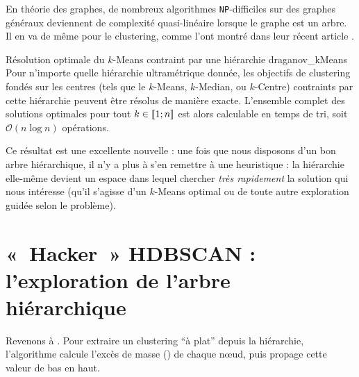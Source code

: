 En théorie des graphes, de nombreux algorithmes \texttt{NP}-difficiles sur des graphes généraux deviennent de complexité quasi-linéaire lorsque le graphe est un arbre. Il en va de même pour le clustering, comme l'ont montré  \etal dans leur récent article \cite{Draganov2025}.

\begin{Resultat}{Résolution optimale du $k$-Means contraint par une hiérarchie \cite{Draganov2025}}{draganov_kMeans}
Pour n'importe quelle hiérarchie ultramétrique donnée, les objectifs de clustering fondés sur les centres (tels que le $k$-Means, $k$-Median, ou $k$-Centre) contraints par cette hiérarchie peuvent être résolus de manière exacte. L'ensemble complet des solutions optimales pour tout $k \in \left[\!\left[ 1 ; n \right]\!\right]$ est alors calculable en temps de tri, soit $\mathcal{O}(n \log n)$ opérations.
\end{Resultat}

Ce résultat est une excellente nouvelle : une fois que nous disposons d'un bon arbre hiérarchique, il n'y a plus à s'en remettre à une heuristique : la hiérarchie elle-même devient un espace dans lequel chercher \emph{très rapidement} la solution qui nous intéresse (qu'il s'agisse d'un $k$-Means optimal ou de toute autre exploration guidée selon le problème).


\section{«~Hacker~» HDBSCAN : l'exploration de l'arbre hiérarchique}

Revenons à \HDBSCAN. Pour extraire un clustering ``à plat'' depuis la hiérarchie, l'algorithme calcule l'excès de masse () de chaque nœud, puis propage cette valeur de bas en haut.


